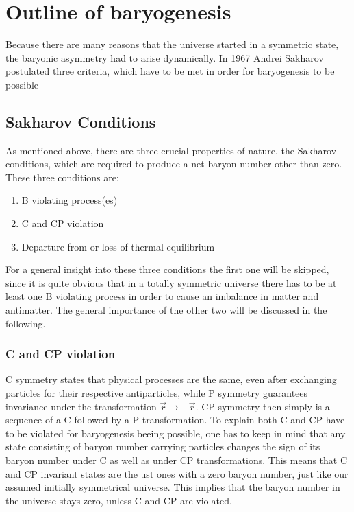 \chapter{Outline of baryogenesis}
Because there are many reasons that the universe started in a symmetric state, the baryonic asymmetry had to arise dynamically.\newline\indent
In 1967 Andrei Sakharov postulated three criteria, which have to be met in order for baryogenesis to be possible 
\section{Sakharov Conditions}
As mentioned above, there are three crucial properties of nature, the Sakharov conditions, which are required to produce a net baryon number other than zero. These three conditions are:
\begin{enumerate}
	\item B violating process(es)
	\item C and CP violation
	\item Departure from or loss of thermal equilibrium
\end{enumerate}
For a general insight into these three conditions the first one will be skipped, since it is quite obvious that in a totally symmetric universe there has to be at least one B violating process in order to cause an imbalance in matter and antimatter. The general importance of the other two will be discussed in the following.
\subsection{C and CP violation}
C symmetry states that physical processes are the same, even after exchanging particles for their respective antiparticles, while P symmetry guarantees invariance under the transformation $\vec{r}\rightarrow-\vec{r}$. CP symmetry then simply is a sequence of a C followed by a P transformation. \newline\indent \indent
To explain both C and CP have to be violated for baryogenesis beeing possible, one has to keep in mind that any state consisting of baryon number carrying particles changes the sign of its baryon number under C as well as under CP transformations\cite[p. 4]{Petropoulos:2003pm}. This means that C and CP invariant states are the ust ones with a zero baryon number, just like our assumed initially symmetrical universe.
This implies that the baryon number in the universe stays zero, unless C and CP are violated\cite[p. 4]{Petropoulos:2003pm}. \newline \indent
